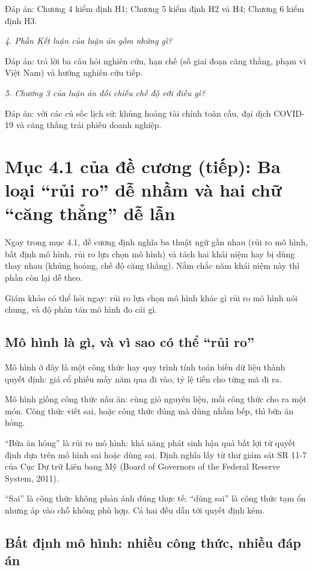 Đáp án: Chương 4 kiểm định H1; Chương 5 kiểm định H2 và H4; Chương 6 kiểm định H3.

{\itshape 4. Phần Kết luận của luận án gồm những gì?\par}

Đáp án: trả lời ba câu hỏi nghiên cứu, hạn chế (số giai đoạn căng thẳng, phạm vi Việt Nam) và hướng nghiên cứu tiếp.

{\itshape 5. Chương 3 của luận án đối chiếu chế độ với điều gì?\par}

Đáp án: với các cú sốc lịch sử: khủng hoảng tài chính toàn cầu, đại dịch COVID-19 và căng thẳng trái phiếu doanh nghiệp.

\chapter{Mục 4.1 của đề cương (tiếp): Ba loại “rủi ro” dễ nhầm và hai chữ “căng thẳng” dễ lẫn}

Ngay trong mục 4.1, đề cương định nghĩa ba thuật ngữ gần nhau (rủi ro mô hình, bất định mô hình, rủi ro lựa chọn mô hình) và tách hai khái niệm hay bị dùng thay nhau (khủng hoảng, chế độ căng thẳng). Nắm chắc năm khái niệm này thì phần còn lại dễ theo.

Giám khảo có thể hỏi ngay: rủi ro lựa chọn mô hình khác gì rủi ro mô hình nói chung, và độ phân tán mô hình đo cái gì.

\section{Mô hình là gì, và vì sao có thể “rủi ro”}

Mô hình ở đây là một công thức hay quy trình tính toán biến dữ liệu thành quyết định: giá cổ phiếu mấy năm qua đi vào, tỷ lệ tiền cho từng mã đi ra.

Mô hình giống công thức nấu ăn: cùng giỏ nguyên liệu, mỗi công thức cho ra một món. Công thức viết sai, hoặc công thức đúng mà dùng nhầm bếp, thì bữa ăn hỏng.

“Bữa ăn hỏng” là rủi ro mô hình: khả năng phát sinh hậu quả bất lợi từ quyết định dựa trên mô hình sai hoặc dùng sai. Định nghĩa lấy từ thư giám sát SR 11-7 của Cục Dự trữ Liên bang Mỹ (Board of Governors of the Federal Reserve System, 2011).

“Sai” là công thức không phản ánh đúng thực tế; “dùng sai” là công thức tạm ổn nhưng áp vào chỗ không phù hợp. Cả hai đều dẫn tới quyết định kém.

\section{Bất định mô hình: nhiều công thức, nhiều đáp án}

